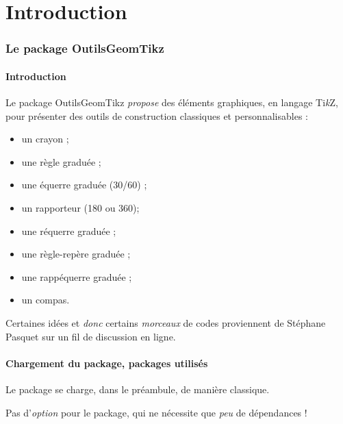 \documentclass[french,a4paper,11pt]{article}
\providecommand\tikzlogo{Ti\textit{k}Z}
\let\TikZ\tikzlogo
\begin{document}
\newpage

\part{Introduction}

\section{Le package OutilsGeomTikz}

\subsection{Introduction}

\begin{noteblock}
Le package \textsf{OutilsGeomTikz} \textit{propose} des éléments graphiques, en langage \TikZ, pour présenter des outils de construction classiques et personnalisables :

\begin{itemize}
	\item un crayon ;
	\item une règle graduée ;
	\item une équerre graduée (30/60) ;
	\item un rapporteur (180 ou 360);
	\item une réquerre graduée ;
	\item une \og règle-repère \fg{} graduée ;
	\item une \og rappéquerre \fg{} graduée ;
	\item un compas.
\end{itemize}
\vspace*{-\baselineskip}\leavevmode
\end{noteblock}

\begin{cautionblock}
Certaines idées et \textit{donc} certains \textit{morceaux} de codes proviennent de Stéphane Pasquet\footnotemark{} sur un fil de discussion en ligne.
\end{cautionblock}

\subsection{Chargement du package, packages utilisés}

\begin{importantblock}
Le package se charge, dans le préambule, de manière classique.

Pas d'\textit{option} pour le package, qui ne nécessite que \textit{peu} de dépendances !
\end{importantblock}
\end{document}
